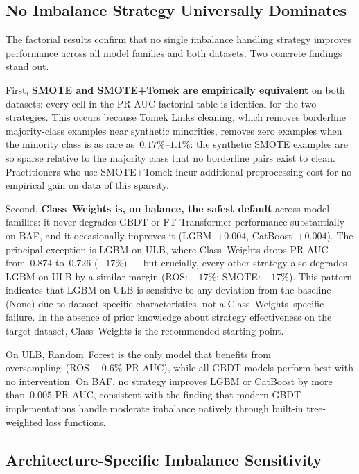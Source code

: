 \documentclass[a4paper,fleqn]{cas-sc}
\begin{document}
\subsection{No Imbalance Strategy Universally Dominates}
\label{subsec:disc_strategy}

The factorial results confirm that no single imbalance handling strategy improves
performance across all model families and both datasets.
Two concrete findings stand out.

First, \textbf{SMOTE and SMOTE+Tomek are empirically equivalent} on both datasets:
every cell in the PR-AUC factorial table is identical for the two strategies.
This occurs because Tomek Links cleaning, which removes borderline majority-class
examples near synthetic minorities, removes zero examples when the minority class is
as rare as~$0.17\%$--$1.1\%$: the synthetic SMOTE examples are so sparse relative to
the majority class that no borderline pairs exist to clean.
Practitioners who use SMOTE+Tomek incur additional preprocessing cost for no empirical
gain on data of this sparsity.

Second, \textbf{Class~Weights is, on balance, the safest default} across model families:
it never degrades GBDT or FT-Transformer performance substantially on BAF, and it
occasionally improves it (LGBM~$+0.004$, CatBoost~$+0.004$).
The principal exception is LGBM on ULB, where Class~Weights drops PR-AUC
from~$0.874$ to~$0.726$ ($-17\%$) --- but crucially, every other strategy also
degrades LGBM on ULB by a similar margin (ROS: $-17\%$; SMOTE: $-17\%$).
This pattern indicates that LGBM on ULB is sensitive to any deviation from the
baseline (None) due to dataset-specific characteristics, not a Class~Weights--specific
failure.
In the absence of prior knowledge about strategy effectiveness on the target dataset,
Class~Weights is the recommended starting point.

On ULB, Random~Forest is the only model that benefits from oversampling~(ROS~$+0.6\%$
PR-AUC), while all GBDT models perform best with no intervention.
On BAF, no strategy improves LGBM or CatBoost by more than~$0.005$ PR-AUC,
consistent with the finding that modern GBDT implementations handle moderate imbalance
natively through built-in tree-weighted loss functions.

\subsection{Architecture-Specific Imbalance Sensitivity}
\label{subsec:disc_architecture}
\end{document}
